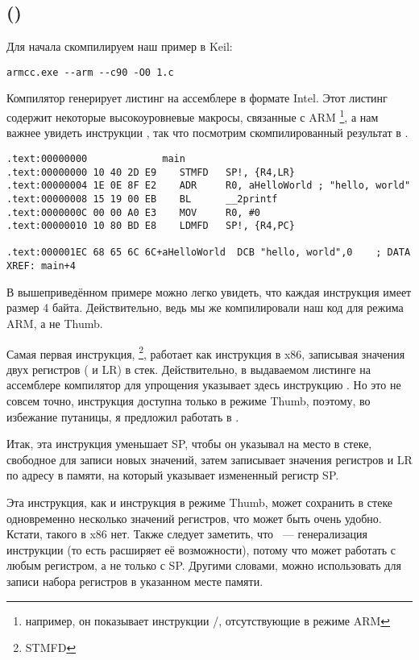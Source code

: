 \subsection{\NonOptimizingKeilVI (\ARMMode)}

Для начала скомпилируем наш пример в Keil:

\begin{lstlisting}
armcc.exe --arm --c90 -O0 1.c 
\end{lstlisting}

\myindex{\IntelSyntax}
Компилятор  генерирует листинг на ассемблере в формате Intel.
Этот листинг содержит некоторые высокоуровневые макросы, связанные с ARM
\footnote{например, он показывает инструкции \PUSH/\POP, отсутствующие в режиме ARM},
а нам важнее увидеть инструкции , так что посмотрим скомпилированный результат в \IDA.

\begin{lstlisting}[caption=\NonOptimizingKeilVI (\ARMMode) \IDA]
.text:00000000             main
.text:00000000 10 40 2D E9    STMFD   SP!, {R4,LR}
.text:00000004 1E 0E 8F E2    ADR     R0, aHelloWorld ; "hello, world"
.text:00000008 15 19 00 EB    BL      __2printf
.text:0000000C 00 00 A0 E3    MOV     R0, #0
.text:00000010 10 80 BD E8    LDMFD   SP!, {R4,PC}

.text:000001EC 68 65 6C 6C+aHelloWorld  DCB "hello, world",0    ; DATA XREF: main+4
\end{lstlisting}

В вышеприведённом примере можно легко увидеть, что каждая инструкция имеет размер 4 байта.
Действительно, ведь мы же компилировали наш код для режима ARM, а не Thumb.

Самая первая инструкция, \footnote{\ac{STMFD}},
работает как инструкция \PUSH в x86, записывая значения двух регистров ( и \ac{LR}) в стек.
Действительно, в выдаваемом листинге на ассемблере компилятор  для упрощения указывает здесь инструкцию
.
Но это не совсем точно, инструкция \PUSH доступна только в режиме Thumb, поэтому,
во избежание путаницы, я предложил работать в \IDA.

Итак, эта инструкция уменьшает \ac{SP}, чтобы он указывал на место в стеке, свободное для записи
новых значений, затем записывает значения регистров  и \ac{LR} 
по адресу в памяти, на который указывает измененный регистр \ac{SP}.

Эта инструкция, как и инструкция \PUSH в режиме Thumb, может сохранить в стеке одновременно несколько значений регистров, что может быть очень удобно.
Кстати, такого в x86 нет.
Также следует заметить, что ~--- генерализация инструкции \PUSH (то есть расширяет её возможности), потому что может работать с любым регистром, а не только с \ac{SP}.
Другими словами,  можно использовать для записи набора регистров в указанном месте памяти.

